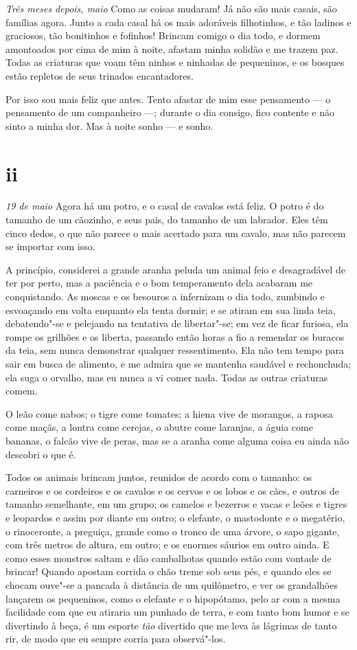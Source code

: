 \textit{Três meses depois, maio} Como as coisas mudaram! Já não são mais casais, são famílias agora.       
Junto a cada casal há os mais adoráveis filhotinhos, e tão ladinos e graciosos, tão bonitinhos e fofinhos!
Brincam comigo o dia todo, e dormem amontoados por cima de mim à noite, afastam minha solidão
e me trazem paz. Todas as criaturas que voam têm ninhos e ninhadas de pequeninos, e os bosques
estão repletos de seus trinados encantadores.

Por isso sou mais feliz que antes. Tento afastar de mim esse pensamento --- o pensamento
de um companheiro ---; durante o dia consigo, fico contente e não sinto a minha dor. Mas
à noite sonho --- e sonho.

\section*{ii}

\textit{19 de maio} Agora há um potro, e o casal de cavalos está feliz. O potro é do tamanho de um cãozinho,
e seus pais, do tamanho de um labrador. Eles têm cinco dedos, o que não parece o mais acertado
para um cavalo, mas não parecem se importar com isso.

A princípio, considerei a grande aranha peluda um animal feio e desagradável de ter por perto,
mas a paciência e o bom temperamento dela acabaram me conquistando. As moscas e os besouros
a infernizam o dia todo, zumbindo e esvoaçando em volta enquanto ela tenta dormir; e se atiram
em sua linda teia, debatendo"-se e pelejando na tentativa de libertar"-se; em vez de ficar furiosa, ela
rompe os grilhões e os liberta, passando então horas a fio a remendar os buracos da teia, sem
nunca demonstrar qualquer ressentimento. Ela não tem tempo para sair em busca de alimento, e me admira
que se mantenha saudável e rechonchuda; ela suga o orvalho, mas eu nunca a vi comer nada. Todas
as outras criaturas comem.

O leão come nabos; o tigre come tomates; a hiena vive de morangos, a raposa come maçãs, a lontra
come cerejas, o abutre come laranjas, a águia come bananas, o falcão vive de peras,
mas se a aranha come alguma coisa eu ainda não descobri o que é.

Todos os animais brincam juntos, reunidos de acordo com o tamanho: os carneiros e os cordeiros e os cavalos e os cervos
e os lobos e os cães, e outros de tamanho semelhante, em um grupo; os camelos e bezerros e vacas e leões e tigres e leopardos e assim por diante em outro;
o elefante, o mastodonte e o megatério, o rinoceronte, a preguiça, grande como o tronco de uma árvore, o sapo gigante, com três metros de altura,
em outro; e os enormes sáurios em outro ainda. E como esses monstros saltam e dão cambalhotas quando estão com vontade de brincar!
Quando apostam corrida o chão treme sob seus pés, e quando eles se chocam ouve"-se a pancada à distância de um quilômetro, e ver
os grandalhões lançarem os pequeninos, como o elefante e o hipopótamo, pelo ar com a mesma facilidade com que eu atiraria um punhado de terra,
e com tanto bom humor e se divertindo à beça, é um esporte \textit{tão} divertido que me leva às lágrimas de tanto rir, de modo que
eu sempre corria para observá"-los.

